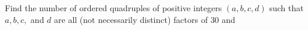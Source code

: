 Find the number of ordered quadruples of positive integers $(a,b,c,d)$ such that $a,b,c,$ and $d$ are all (not necessarily distinct) factors of $30$ and 